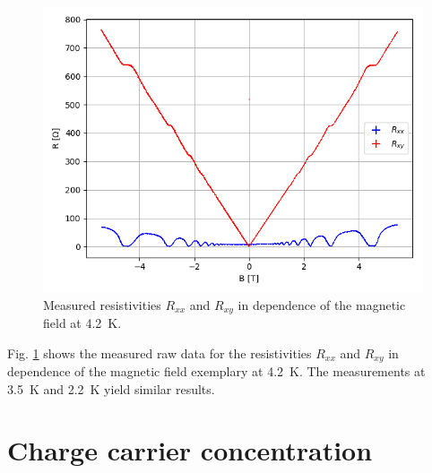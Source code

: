 \documentclass[12pt,a4paper]{article}
\begin{document}
\begin{figure} [H]
\centering
\includegraphics[scale=0.8]{Bilder/Elektron_g/4_2/Rohdaten.PNG}
\caption{Measured resistivities $R_{xx}$ and $R_{xy}$ in dependence of the magnetic field at \SI{4.2}{K}.}
\label{fig:raw_data}
\end{figure}

Fig. \ref{fig:raw_data} shows the measured raw data for the resistivities $R_{xx}$ and $R_{xy}$ in dependence of the magnetic field exemplary at \SI{4.2}{K}. The measurements at \SI{3.5}{K} and \SI{2.2}{K} yield similar results.



\section{Charge carrier concentration}
\end{document}

